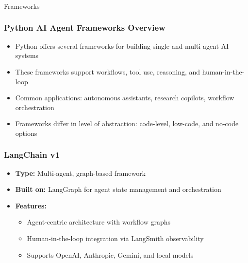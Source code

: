 \begin{frame}[fragile]\frametitle{}
\begin{center}
{\Large Frameworks}
\end{center}
\end{frame}

\begin{frame}[fragile]\frametitle{Python AI Agent Frameworks Overview}
    \begin{itemize}
        \item Python offers several frameworks for building single and multi-agent AI systems
        \item These frameworks support workflows, tool use, reasoning, and human-in-the-loop
        \item Common applications: autonomous assistants, research copilots, workflow orchestration
        \item Frameworks differ in level of abstraction: code-level, low-code, and no-code options
    \end{itemize}
\end{frame}

\begin{frame}[fragile]\frametitle{LangChain v1}
    \begin{itemize}
        \item \textbf{Type:} Multi-agent, graph-based framework
        \item \textbf{Built on:} LangGraph for agent state management and orchestration
        \item \textbf{Features:}
              \begin{itemize}
                  \item Agent-centric architecture with workflow graphs
                  \item Human-in-the-loop integration via LangSmith observability
                  \item Supports OpenAI, Anthropic, Gemini, and local models
              \end{itemize}
    \end{itemize}
\end{frame}


